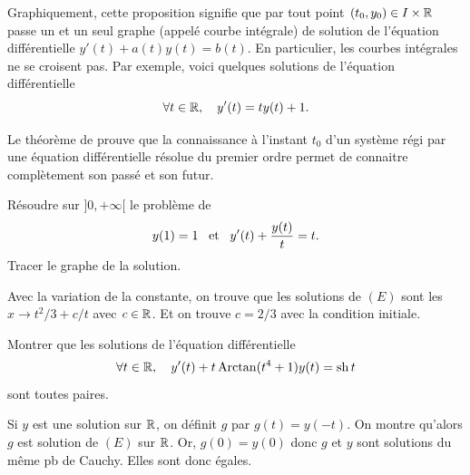 \documentclass{magnolia}
\begin{document}
\begin{remarques}
\remarque Graphiquement, cette proposition signifie que par tout
  point $(t_0,y_0)\in I\times \mathbb{R}$ passe un et un seul graphe (appelé courbe
  intégrale) de solution de l'équation différentielle $y'(t)+a(t) y(t)=b(t)$. En
  particulier, les courbes intégrales ne se croisent pas. Par exemple, voici quelques
  solutions de l'équation différentielle
  \[\forall t\in\mathbb{R},\quad y'(t)=ty(t)+1.\]
\begin{center}
\end{center}
\remarque Le théorème de  prouve que la connaissance à l'instant $t_0$ d'un système régi par une équation différentielle résolue du premier ordre permet de connaitre complètement son passé et son futur.
\end{remarques}

\begin{exos}
\exo Résoudre sur $]0,+\infty[$ le problème de 
  \[y(1)=1 \quad\!\text{et}\quad\! y'(t)+\frac{y(t)}{t}=t.\]
Tracer le graphe de la solution.
\begin{sol}
Avec la variation de la constante, on trouve que les solutions de $(E)$ sont les $x\to t^2/3+c/t$ avec $c\in \mathbb{R}$. Et on trouve $c=2/3$ avec la condition initiale.
\end{sol}
\exo Montrer que les solutions de l'équation différentielle
  \[\forall t\in\mathbb{R} ,\quad y'(t)+t\operatorname{Arctan}(t^4+1)y(t)=\operatorname{sh} t\]
  sont toutes paires.
\end{exos}
\begin{sol}
Si $y$ est une solution sur $\mathbb{R}$, on définit $g$ par $g(t)=y(-t)$. On montre qu'alors $g$ est solution de $(E)$ sur $\mathbb{R}$. Or, $g(0)=y(0)$ donc $g$ et $y$ sont solutions du même pb de Cauchy. Elles sont donc égales.
\end{sol}
\end{document}
